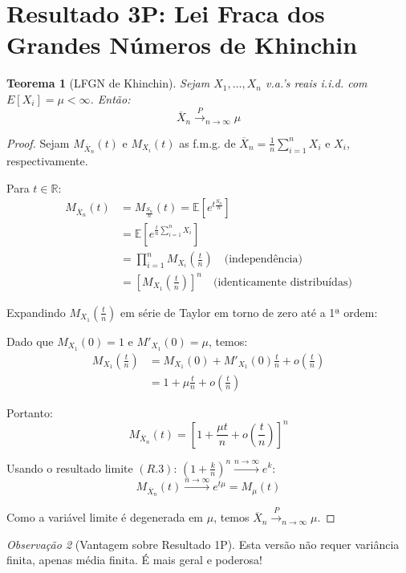 \documentclass[12pt,a4paper]{article}
\theoremstyle{plain}
\newtheorem{teorema}{Teorema}[section]
\theoremstyle{definition}
\theoremstyle{remark}
\newtheorem{observacao}[teorema]{Observação}
\begin{document}
\section{Resultado 3P: Lei Fraca dos Grandes Números de Khinchin}

\begin{teorema}[LFGN de Khinchin]
Sejam $X_1, \ldots, X_n$ v.a.'s reais i.i.d. com $E[X_i] = \mu < \infty$. Então:
\[
\overline{X}_n \xrightarrow{P}_{n \to \infty} \mu
\]
\end{teorema}

\begin{proof}
Sejam $M_{\overline{X}_n}(t)$ e $M_{X_i}(t)$ as f.m.g. de $\overline{X}_n = \frac{1}{n} \sum_{i=1}^n X_i$ e $X_i$, respectivamente.

Para $t \in \mathbb{R}$:
\begin{align}
M_{\overline{X}_n}(t) &= M_{\frac{S_n}{n}}(t) = \mathbb{E}\left[e^{t\frac{S_n}{n}}\right] \\
&= \mathbb{E}\left[e^{\frac{t}{n}\sum_{i=1}^n X_i}\right] \\
&= \prod_{i=1}^n M_{X_i}\left(\frac{t}{n}\right) \quad \text{(independência)} \\
&= \left[ M_{X_1}\left(\frac{t}{n}\right) \right]^n \quad \text{(identicamente distribuídas)}
\end{align}

Expandindo $M_{X_1}\left(\frac{t}{n}\right)$ em série de Taylor em torno de zero até a 1ª ordem:

Dado que $M_{X_1}(0) = 1$ e $M'_{X_1}(0) = \mu$, temos:
\begin{align}
M_{X_1}\left(\frac{t}{n}\right) &= M_{X_1}(0) + M'_{X_1}(0) \frac{t}{n} + o\left(\frac{t}{n}\right) \\
&= 1 + \mu \frac{t}{n} + o\left(\frac{t}{n}\right)
\end{align}

Portanto:
\[
M_{\overline{X}_n}(t) = \left[ 1 + \frac{\mu t}{n} + o\left(\frac{t}{n}\right) \right]^n
\]

Usando o resultado limite $(R.3)$: $\left(1 + \frac{k}{n}\right)^n \xrightarrow{n \to \infty} e^k$:
\[
M_{\overline{X}_n}(t) \xrightarrow{n \to \infty} e^{t\mu} = M_{\mu}(t)
\]

Como a variável limite é degenerada em $\mu$, temos $\overline{X}_n \xrightarrow{P}_{n \to \infty} \mu$.
\end{proof}

\begin{observacao}[Vantagem sobre Resultado 1P]
Esta versão não requer variância finita, apenas média finita. É mais geral e poderosa!
\end{observacao}
\end{document}
